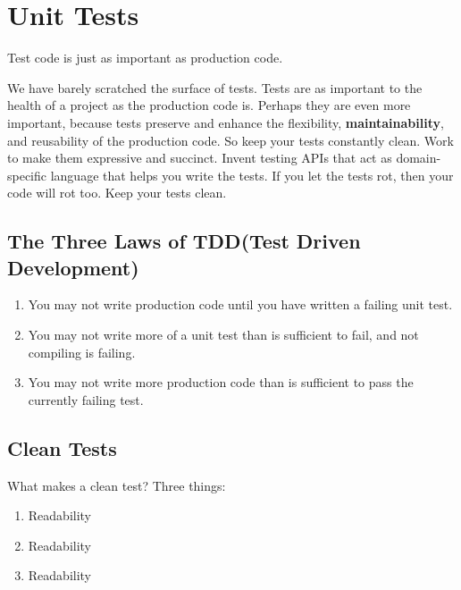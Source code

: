 
\chapter{Unit Tests}

\begin{center}
    Test code is just as important as production code.
\end{center}

We have barely scratched the surface of tests. Tests are as important to the health of a project as the production code
is. Perhaps they are even more important, because tests preserve and enhance the flexibility, \textbf{maintainability},
and reusability of the production code. So keep your tests constantly clean. Work to make them expressive and succinct.
Invent testing APIs that act as domain-specific language that helps you write the tests. If you let the tests rot, then
your code will rot too. Keep your tests clean.

\section{The Three Laws of TDD(Test Driven Development)}

\begin{tcolorbox}[breakable, colback=blue!10!white, colframe=blue!85!black, title=The Three Laws of TDD]
\begin{enumerate}
    \item You may not write production code until you have written a failing unit test.
    \item You may not write more of a unit test than is sufficient to fail, and not compiling is failing.
    \item You may not write more production code than is sufficient to pass the currently failing test.
\end{enumerate}
\end{tcolorbox}

\section{Clean Tests}

What makes a clean test? Three things:

\begin{enumerate}
    \item Readability
    \item Readability
    \item Readability
\end{enumerate}

